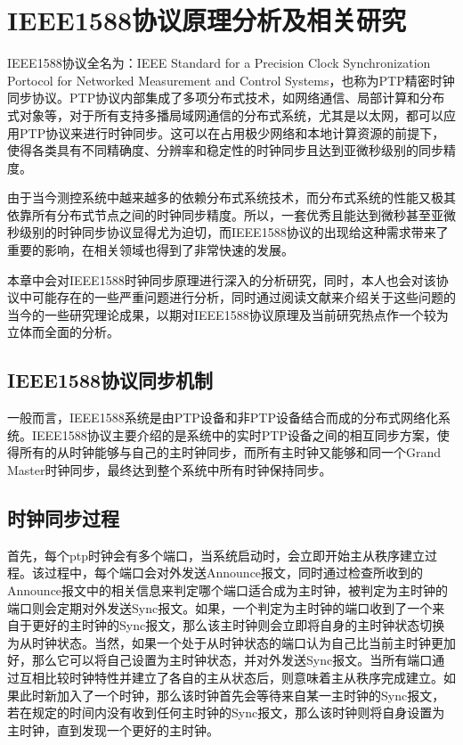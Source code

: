
\chapter{IEEE1588协议原理分析及相关研究}
\label{chap:1588_theory}
IEEE1588协议全名为：IEEE Standard for a Precision Clock Synchronization Portocol for Networked Measurement and Control Systems，也称为PTP精密时钟同步协议。PTP协议内部集成了多项分布式技术，如网络通信、局部计算和分布式对象等，对于所有支持多播局域网通信的分布式系统，尤其是以太网，都可以应用PTP协议来进行时钟同步。这可以在占用极少网络和本地计算资源的前提下，使得各类具有不同精确度、分辨率和稳定性的时钟同步且达到亚微秒级别的同步精度。

由于当今测控系统中越来越多的依赖分布式系统技术，而分布式系统的性能又极其依靠所有分布式节点之间的时钟同步精度。所以，一套优秀且能达到微秒甚至亚微秒级别的时钟同步协议显得尤为迫切，而IEEE1588协议的出现给这种需求带来了重要的影响，在相关领域也得到了非常快速的发展。

本章中会对IEEE1588时钟同步原理进行深入的分析研究，同时，本人也会对该协议中可能存在的一些严重问题进行分析，同时通过阅读文献来介绍关于这些问题的当今的一些研究理论成果，以期对IEEE1588协议原理及当前研究热点作一个较为立体而全面的分析。

\section{IEEE1588协议同步机制}
一般而言，IEEE1588系统是由PTP设备和非PTP设备结合而成的分布式网络化系统。IEEE1588协议主要介绍的是系统中的实时PTP设备之间的相互同步方案，使得所有的从时钟能够与自己的主时钟同步，而所有主时钟又能够和同一个Grand Master时钟同步，最终达到整个系统中所有时钟保持同步。

\section{时钟同步过程}
首先，每个ptp时钟会有多个端口，当系统启动时，会立即开始主从秩序建立过程。该过程中，每个端口会对外发送Announce报文，同时通过检查所收到的Announce报文中的相关信息来判定哪个端口适合成为主时钟，被判定为主时钟的端口则会定期对外发送Sync报文。如果，一个判定为主时钟的端口收到了一个来自于更好的主时钟的Sync报文，那么该主时钟则会立即将自身的主时钟状态切换为从时钟状态。当然，如果一个处于从时钟状态的端口认为自己比当前主时钟更加好，那么它可以将自己设置为主时钟状态，并对外发送Sync报文。当所有端口通过互相比较时钟特性并建立了各自的主从状态后，则意味着主从秩序完成建立。如果此时新加入了一个时钟，那么该时钟首先会等待来自某一主时钟的Sync报文，若在规定的时间内没有收到任何主时钟的Sync报文，那么该时钟则将自身设置为主时钟，直到发现一个更好的主时钟。

